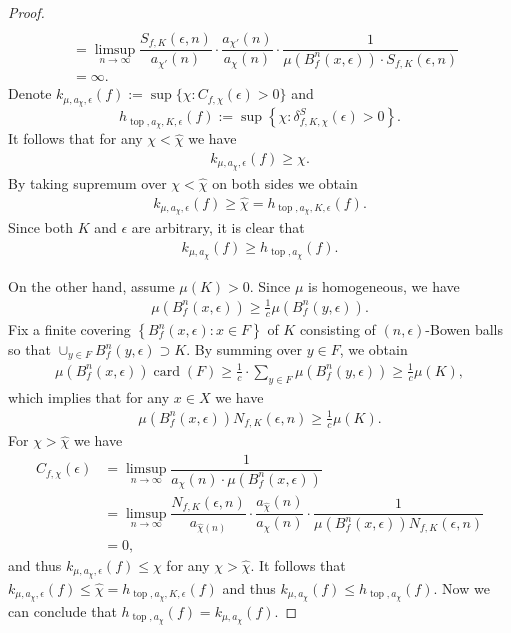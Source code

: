 \documentclass[oneside]{amsart}
\theoremstyle{plain}
\theoremstyle{definition}
\DeclareMathOperator{\card}{card}
\newcommand{\<}{\langle}
\renewcommand{\>}{\rangle}
\newcommand{\e}{\epsilon}
\newcommand{\topo}{\operatorname{top}}
\renewcommand{\|}{|\!|} %
\begin{document}
\begin{proof}
\begin{align*}
    \\ 
    &=\limsup_{n\to\infty}\dfrac{S_{f,K}(\e,n)}{a_{ \chi'} (n) }\cdot \dfrac{a_{ \chi' }(n)}{a_{\chi}(n)} \cdot\dfrac{1}{ \mu(B_f^n(x,\e)) \cdot S_{f,K}(\e,n)}  
    \\
    &= \infty .
  \end{align*} 
  Denote $k_{\mu ,a_{\chi },\e} (f):= \sup \{ \chi : C_{f,\chi}(\e) > 0 \}$ and 
  \begin{equation*}
      h_{\topo,a_\chi,K,\e}(f):=
     \sup \left\{ \chi:
    \delta_{f,K,\chi}^S(\e)>0 \right\}.
  \end{equation*}
It follows that for any $\chi <  \hat{\chi } $ we have 
  \begin{align*}
    k_{\mu , a_\chi, \e  } (f ) \ge \chi .
  \end{align*}
  By taking supremum over $\chi <  \hat{\chi } $ on both sides we obtain 
  \begin{align*}
    k_{\mu ,a_{\chi }, \e } (f ) \ge  \hat{\chi }  = h_{\topo,a_{\chi }, K , \e } (f).
  \end{align*}
  Since both $K$ and $\e $ are arbitrary, it is clear that 
  \begin{align*}
    k_{\mu ,a_{\chi }} (f) \ge h_{\topo, a_{\chi }} (f).
  \end{align*} 

  On the other hand, assume $\mu (K) >0$.  Since  $\mu$ is homogeneous, we have 
  \begin{align}
    \label{eq: k=top covering}
    \mu \left( B^n_f(x,\e ) \right) \ge \frac{1}{c}  \mu \left( B^n_f(y,\e ) \right).    
  \end{align}
  Fix a finite covering $\left\{ B^n_f(x,\e ) : x \in F  \right\}$ of $K$ consisting of $(n,\e )$-Bowen balls so that $\cup_{y \in F} B^n_f(y,\e ) \supset K$.  By summing  over $y \in F$,  we obtain
  \begin{align*}
    \mu \left( B^n_f(x,\e ) \right) \card (F) \ge \frac{1}{c} \cdot \sum_{y \in F} \mu \left( B^n_f(y,\e ) \right) \ge \frac{1}{c} \mu (K),
  \end{align*}
  which implies that for any $x \in X$ we have 
  \begin{align*}
    \mu \left( B^n_f(x,\e ) \right) N_{f,K} (\e,n) \ge  \frac{1}{c}  \mu (K).
  \end{align*}
  For $\chi >  \hat{\chi } $ we have 
  \begin{align*}
    C_{f ,\chi }(\e) 
    &= \limsup_{n\to\infty}\dfrac{1}{a_\chi(n) \cdot \mu(B_f^n(x,\e))} 
    \\  
    &=\limsup_{n\to\infty}\dfrac{N_{f,K}(\e,n)}{a_{ \hat{\chi } (n) }}\cdot \dfrac{a_{ \hat{\chi } }(n)}{a_{\chi } (n)} \cdot\dfrac{1}{ \mu(B_f^n(x,\e)) N_{f,K}(\e,n)}  
    \\
    &= 0,
  \end{align*} 
  and thus $k_{\mu ,a_{\chi },\e } (f) \le  \chi $ for any $\chi >  \hat{\chi } .$ It follows that $k_{\mu ,a_{\chi },\e } (f) \le  \hat{\chi } = h_{\topo,a_{\chi }, K , \e } (f) $ and thus $k_{\mu ,a_{\chi }} (f) \le h_{\topo, a_{\chi }} (f).$ Now we can conclude that $h_{\topo, a_{\chi }} (f) = k_{\mu ,a_{\chi }} (f).$  


\end{proof}
\end{document}
